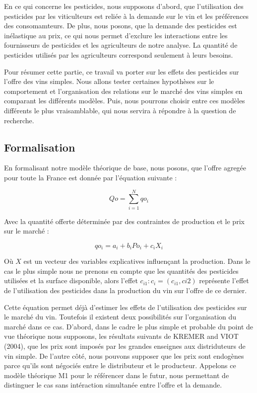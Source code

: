 \documentclass[11pt,]{article}
\begin{document}
En ce qui concerne les pesticides, nous supposons d'abord, que
l'utilisation des pesticides par les viticulteurs est reliée à la
demande sur le vin et les préférences des consomamteurs. De plus, nous
posons, que la demande des pesticides est inélastique au prix, ce qui
nous permet d'exclure les interactions entre les fournisseurs de
pesticides et les agriculteurs de notre analyse. La quantité de
pesticides utilisés par les agriculteurs correspond seulement à leurs
besoins.

Pour résumer cette partie, ce travail va porter sur les effets des
pesticides sur l'offre des vins simples. Nous allons tester certaines
hypothèses sur le comportement et l'organisation des relations sur le
marché des vins simples en comparant les différents modèles. Puis, nous
pourrons choisir entre ces modèles différents le plus vraisamblable, qui
nous servira à répondre à la question de recherche.

\hypertarget{formalisation}{%
\subsection{Formalisation}\label{formalisation}}

En formalisant notre modèle théorique de base, nous posons, que l'offre
agregée pour toute la France est donnée par l'équation suivante :

\begin{equation}
    Qo = \sum_{i = 1}^{N} qo_i
\end{equation}

Avec la quantité offerte déterminée par des contraintes de production et
le prix sur le marché :

\begin{equation}
    qo_i = a_i + b_i Po_i + c_i X_i
\end{equation}

Où \(X\) est un vecteur des variables explicatives influençant la
production. Dans le cas le plus simple nous ne prenons en compte que les
quantités des pesticides utilisées et la surface disponible, alors
l'effet \(c_{i1} : c_i = (c_{i1}, c{i2})\) représente l'effet de
l'utilisation des pesticides dans la production du vin sur l'offre de ce
dernier.

Cette équation permet déjà d'estimer les effets de l'utilisation des
pesticides sur le marché du vin. Toutefois il existent deux possibilités
sur l'organisation du marché dans ce cas. D'abord, dans le cadre le plus
simple et probable du point de vue théorique nous supposons, les
résultats suivants de KREMER and VIOT (2004), que les prix sont imposés
par les grandes enseignes aux distriduteurs de vin simple. De l'autre
côté, nous pouvons supposer que les prix sont endogènes parce qu'ils
sont négociés entre le distributeur et le producteur. Appelons ce modèle
théorique M1 pour le référencer dans le futur, nous permettant de
distinguer le cas sans intéraction simultanée entre l'offre et la
demande.
\end{document}

